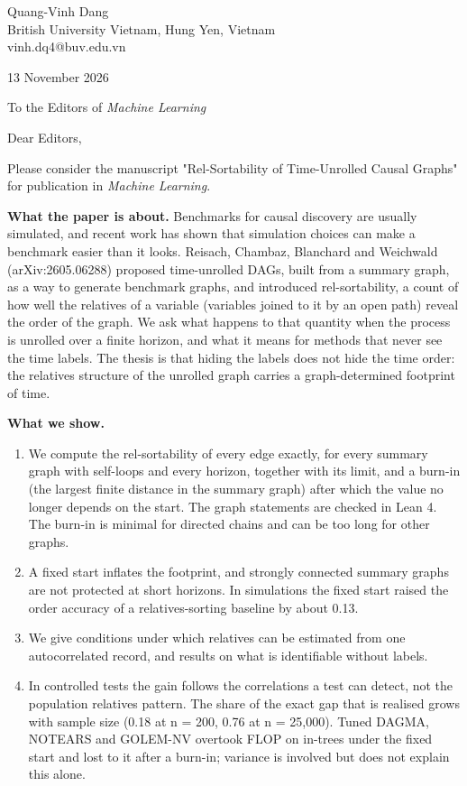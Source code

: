 \documentclass[11pt]{article}
\begin{document}
Quang-Vinh Dang\\
British University Vietnam, Hung Yen, Vietnam\\
vinh.dq4@buv.edu.vn

13 November 2026

To the Editors of \textit{Machine Learning}

Dear Editors,

Please consider the manuscript "Rel-Sortability of Time-Unrolled Causal Graphs" for publication in \textit{Machine Learning}.

\textbf{What the paper is about.} Benchmarks for causal discovery are usually simulated, and recent work has shown that simulation choices can make a benchmark easier than it looks. Reisach, Chambaz, Blanchard and Weichwald (arXiv:2605.06288) proposed time-unrolled DAGs, built from a summary graph, as a way to generate benchmark graphs, and introduced rel-sortability, a count of how well the relatives of a variable (variables joined to it by an open path) reveal the order of the graph. We ask what happens to that quantity when the process is unrolled over a finite horizon, and what it means for methods that never see the time labels. The thesis is that hiding the labels does not hide the time order: the relatives structure of the unrolled graph carries a graph-determined footprint of time.

\textbf{What we show.}

\begin{enumerate}\setlength\itemsep{2pt}

\item We compute the rel-sortability of every edge exactly, for every summary graph with self-loops and every horizon, together with its limit, and a burn-in (the largest finite distance in the summary graph) after which the value no longer depends on the start. The graph statements are checked in Lean 4. The burn-in is minimal for directed chains and can be too long for other graphs.

\item A fixed start inflates the footprint, and strongly connected summary graphs are not protected at short horizons. In simulations the fixed start raised the order accuracy of a relatives-sorting baseline by about 0.13.

\item We give conditions under which relatives can be estimated from one autocorrelated record, and results on what is identifiable without labels.

\item In controlled tests the gain follows the correlations a test can detect, not the population relatives pattern. The share of the exact gap that is realised grows with sample size (0.18 at n = 200, 0.76 at n = 25,000). Tuned DAGMA, NOTEARS and GOLEM-NV overtook FLOP on in-trees under the fixed start and lost to it after a burn-in; variance is involved but does not explain this alone.

\end{enumerate}
\end{document}
